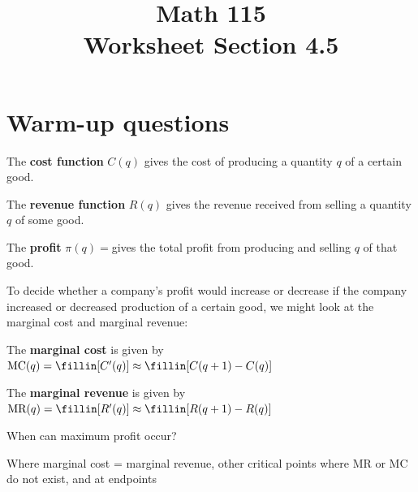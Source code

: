 \documentclass[11pt]{exam}
\title{\vspace{-0.5in} Math 115 \\ Worksheet Section 4.5}
\date{}
\begin{document}
\maketitle
\vspace{-0.75in}
\section*{Warm-up questions}
The {\bf cost function} $C(q)$ gives the cost of producing a quantity $q$ of a certain good.

\noindent
The {\bf revenue function} $R(q)$ gives the revenue received from selling a quantity $q$ of some good.

\noindent
The {\bf profit} $\pi(q)=$\fillin[\(R(q)-C(q)\)] gives the total profit from producing and selling $q$ of that good.

\noindent
To decide whether a company's profit would increase or decrease if the company increased or decreased production of a certain good, we might look at the marginal cost and marginal revenue:

\vspace{0.5em}
The {\bf marginal cost} is given by $\textrm{MC}(q)= \fillin[C'(q)]\approx
\fillin[C(q+1)-C(q)]$

\vspace{0.5em}
The {\bf marginal revenue} is given by $\textrm{MR}(q)= \fillin[R'(q)
]\approx \fillin[R(q+1)-R(q)]$
\vspace{1em}

\noindent
When can maximum profit occur?
\begin{solution}
  Where marginal cost = marginal revenue, other critical points where
  MR or MC do not exist, and at endpoints
\end{solution}
\vspace{1em}
\end{document}
